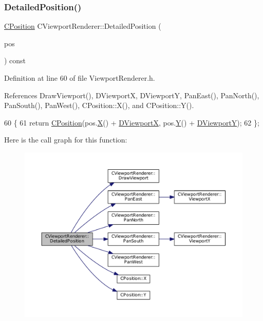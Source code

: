 \subsubsection{\texorpdfstring{Detailed\+Position()}{DetailedPosition()}}
{\footnotesize\ttfamily \hyperlink{classCPosition}{C\+Position} C\+Viewport\+Renderer\+::\+Detailed\+Position (\begin{DoxyParamCaption}\item[{const \hyperlink{classCPosition}{C\+Position} \&}]{pos }\end{DoxyParamCaption}) const\hspace{0.3cm}{\ttfamily [inline]}}



Definition at line 60 of file Viewport\+Renderer.\+h.



References Draw\+Viewport(), D\+ViewportX, D\+ViewportY, Pan\+East(), Pan\+North(), Pan\+South(), Pan\+West(), C\+Position\+::\+X(), and C\+Position\+::\+Y().


\begin{DoxyCode}
60                                                               \{
61             \textcolor{keywordflow}{return} \hyperlink{classCPosition}{CPosition}(pos.\hyperlink{classCPosition_a9a6b94d3b91df1492d166d9964c865fc}{X}() + \hyperlink{classCViewportRenderer_aea9e05347f71a8e6b83439aab653be18}{DViewportX}, pos.\hyperlink{classCPosition_a1aa8a30e2f08dda1f797736ba8c13a87}{Y}() + 
      \hyperlink{classCViewportRenderer_ae13dd437a3da3d2bab16bc7ba61cb78f}{DViewportY});  
62         \};
\end{DoxyCode}
Here is the call graph for this function\+:\nopagebreak
\begin{figure}[H]
\begin{center}
\leavevmode
\includegraphics[width=350pt]{classCViewportRenderer_a2c23b54725686c6219c8765e48351d72_cgraph}
\end{center}
\end{figure}
\hypertarget{classCViewportRenderer_ad5cf67fd6d4d69f861dbc0b773cdcab2}{}\label{classCViewportRenderer_ad5cf67fd6d4d69f861dbc0b773cdcab2} 
